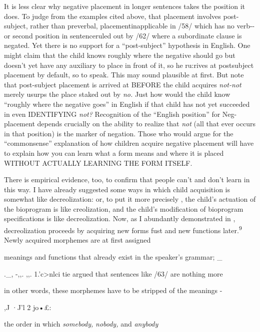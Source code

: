It is less clear why negative placement in longer sentences takes the position it does. To judge from the examples cited above, that placement involves post-subject, rather than preverbal, placement\-inapplicable in /58/ which has no verb-{}-or second position in sentence\-ruled out by /62/ where a subordinate clause is negated. Yet there is no support for a ``post-subject'' hypothesis in English. One might claim that the child knows roughly where the negative should go but doesn't yet have any auxiliary to place in front of it, so he ru:rives at post\-subject placement by default, so to speak. This may sound plausible at first. But note that post-subject placement is arrived at BEFORE the child acquires \textit{not-not} merely usurps the place staked out by \textit{no.} Just how would the child know ``roughly where the negative goes'' in English if that child has not yet succeeded in even IDENTIFYING \textit{not?} Recognition of the ``English position'' for Neg-placement depends crucially on the ability to realize that \textit{not} (all that ever occurs in that position) is the marker of negation. Those who would argue for the ``commonsense'' explanation of how children acquire negative place\-ment will have to explain how you can learn what a form means and where it is placed WITHOUT ACTUALLY LEARNING THE FORM ITSELF.

There is empirical evidence, too, to confirm that people can't and don't learn in this way. I have already suggested some ways in which child acquisition is somewhat like decreolization: or, to put it more precisely , the child's actuation of the bioprogram is like creoliza\-tion, and the child's modification of bioprogram specifications is like decreolization. Now, as I abundantly demonstrated in \citet{Bickerton1975}, decreolization proceeds by acquiring new forms fust and new functions later.\textsuperscript{9 }Newly acquired morphemes are at first assigned


meanings and functions that already exist in the speaker's grammar; \_

.\_, {}-,,. ,,. 1.'c{\textgreater}nlci tie argued that sentences like /63/ are nothing more

in other words, these morphemes have to be stripped of the meanings -

,J ·J'l 2 jo•£:

the order in which \textit{somebody,} \textit{nobody,} and \textit{anybody}

